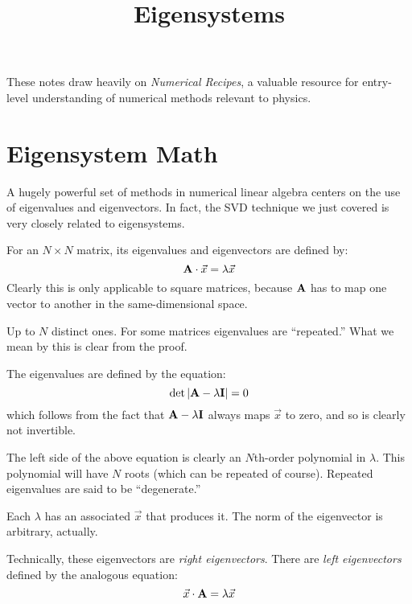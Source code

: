 \title{Eigensystems}

These notes draw heavily on {\it Numerical Recipes}, a valuable
resource for entry-level understanding of numerical methods relevant
to physics.

\section{Eigensystem Math}

A hugely powerful set of methods in numerical linear algebra centers
on the use of eigenvalues and eigenvectors. In fact, the SVD technique
we just covered is very closely related to eigensystems.


\begin{answer}
For an $N\times N$ matrix, its eigenvalues and eigenvectors are
defined by:
\begin{equation}
{\bf A}\cdot\vec{x} = \lambda \vec{x}
\end{equation}
Clearly this is only applicable to square matrices, because ${\bf A}$
has to map one vector to another in the same-dimensional space.
\end{answer}


\begin{answer}
Up to $N$ distinct ones. For some matrices eigenvalues are
``repeated.'' What we mean by this is clear from the proof.

The eigenvalues are defined by the equation:
\begin{equation}
\det\left|{\bf A} - \lambda {\bf I}\right| = 0
\end{equation}
which follows from the fact that ${\bf A} - \lambda {\bf I}$ always
maps $\vec{x}$ to zero, and so is clearly not invertible.

The left side of the above equation is clearly an $N$th-order
polynomial in $\lambda$. This polynomial will have $N$ roots (which
can be repeated of course). Repeated eigenvalues are said to be
``degenerate.'' 

Each $\lambda$ has an associated $\vec{x}$ that produces it. The norm
of the eigenvector is arbitrary, actually.
\end{answer}

Technically, these eigenvectors are {\it right eigenvectors}. There
are {\it left eigenvectors} defined by the analogous equation:
\begin{equation}
\vec{x}\cdot{\bf A} = \lambda \vec{x}
\end{equation}

